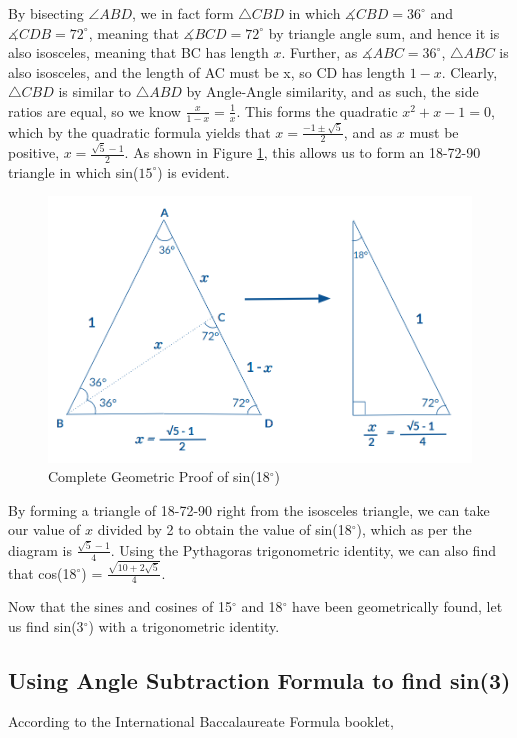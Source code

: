 \documentclass[12pt]{article}
\begin{document}
By bisecting $\angle{ABD}$, we in fact form $\triangle{CBD}$ in which $\measuredangle CBD = 36^{\circ}$ and  $\measuredangle CDB = 72^{\circ}$, meaning that $\measuredangle BCD = 72^{\circ}$ by triangle angle sum, and hence it is also isosceles, meaning that BC has length $x$. Further, as $\measuredangle ABC = 36^{\circ}$, $\triangle ABC$ is also isosceles, and the length of AC must be x, so CD has length $1-x$. Clearly, $\triangle CBD$ is similar to $\triangle ABD$ by Angle-Angle similarity, and as such, the side ratios are equal, so we know $\frac{x}{1-x}=\frac{1}{x}$. This forms the quadratic $x^2+x-1=0$, which by the quadratic formula yields that $x=\frac{-1\pm \sqrt{5}}{2}$, and as $x$ must be positive, $x=\frac{\sqrt{5}-1}{2}$. As shown in Figure \ref{fig:18comp}, this allows us to form an 18-72-90 triangle in which sin($15^{\circ}$) is evident.

\begin{figure}[h]
    \centering
    \includegraphics[width=0.8\linewidth]{18-72-90-complete.png}
    \caption{Complete Geometric Proof of sin(18$^{\circ}$)}
    \label{fig:18comp}
\end{figure}

By forming a triangle of 18-72-90 right from the isosceles triangle, we can take our value of $x$ divided by 2 to obtain the value of sin(18$^{\circ}$), which as per the diagram is $\frac{\sqrt{5}-1}{4}$. Using the Pythagoras trigonometric identity, we can also find that cos(18$^{\circ}$) = $\frac{\sqrt{10+2\sqrt{5}}}{4}$.

Now that the sines and cosines of 15$^{\circ}$ and 18$^{\circ}$ have been geometrically found, let us find sin(3$^{\circ}$) with a trigonometric identity.

\subsection{Using Angle Subtraction Formula to find sin(3)}
According to the International Baccalaureate Formula booklet,
\end{document}
